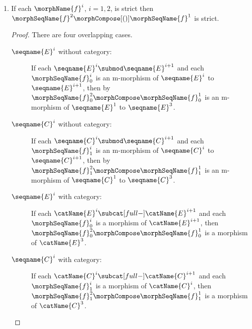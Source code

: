 \documentclass{article}
\begin{document}
\begin{lemma}
\begin{enumerate}
\begin{proof}
\begin{description}
\item[$\seqname{C}^i$ with category:]
If each $\catName{C}^i \subcat[full-] \catName{C}^{i+1}$ and each
$\morphSeqName{f}^i_1$ is a local $\catName{C}^i$-$\catName{C}^{i+1}$
m-morphism of $\seqname{C}^i$ to $\seqname{C}^{i+1}$, then by
$\morphSeqName{f}^2_1 \morphCompose \morphSeqName{f}^1_1$ is a local
$\catName{C}^1$-$\catName{C}^3$ m-morphism of $\seqname{C}^1$ to
$\seqname{C}^3$.
\end{description}
\end{proof}

\item
\label{M-morphcomp:strictcompstrict}
If each $\morphName{f}^i$, $i=1,2$, is strict then
$\morphSeqName{f}^2 \morphCompose[()] \morphSeqName{f}^1$ is strict.

\begin{proof}
There are four overlapping cases.
\begin{description}
\item[$\seqname{E}^i$ without category:]
If each $\seqname{E}^i \submod \seqname{E}^{i+1}$ and each
$\morphSeqName{f}^i_0$ is an m-morphism of $\seqname{E}^i$ to
$\seqname{E}^{i+1}$, then by 
$\morphSeqName{f}^2_0 \morphCompose \morphSeqName{f}^1_0$ is an
m-morphism of $\seqname{E}^1$ to $\seqname{E}^3$.

\item[$\seqname{C}^i$ without category:]
If each $\seqname{C}^i \submod \seqname{C}^{i+1}$ and each
$\morphSeqName{f}^i_1$ is an m-morphism of $\seqname{C}^i$ to
$\seqname{C}^{i+1}$, then by 
$\morphSeqName{f}^2_1 \morphCompose \morphSeqName{f}^1_1$ is an
m-morphism of $\seqname{C}^1$ to $\seqname{C}^3$.

\item[$\seqname{E}^i$ with category:]
If each $\catName{E}^i \subcat[full-] \catName{E}^{i+1}$ and each
$\morphSeqName{f}^i_0$ is a morphism of $\catName{E}^{i+1}$, then
$\morphSeqName{f}^2_0 \morphCompose \morphSeqName{f}^1_0$ is a morphism of
$\catName{E}^3$.

\item[$\seqname{C}^i$ with category:]
If each $\catName{C}^i \subcat[full-] \catName{C}^{i+1}$ and each
$\morphSeqName{f}^i_1$ is a morphism of $\catName{C}^i$, then
$\morphSeqName{f}^2_1 \morphCompose \morphSeqName{f}^1_1$ is a
morphism of $\catName{C}^3$.
\end{description}
\end{proof}


\end{enumerate}
\end{lemma}
\end{document}
